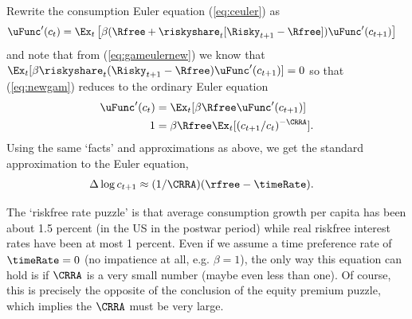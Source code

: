 \documentclass{handout}
\begin{document}

Rewrite the consumption Euler equation (\ref{eq:ceuler}) as 
\begin{equation}\begin{gathered}\begin{aligned}
        \uFunc^{\prime}(c_{t}) & =  \Ex_{t}\left[\beta (\Rfree  + \riskyshare_{t} [\Risky_{t+1} - \Rfree])\uFunc^{\prime}({c}_{t+1})\right] \label{eq:newgam}
\end{aligned}\end{gathered}\end{equation}
and note that from (\ref{eq:gameulernew}) we know that $\Ex_{t}[\beta 
\riskyshare_{t}(\Risky_{t+1}-\Rfree)\uFunc^{\prime}({c}_{t+1})] = 0$ so that 
(\ref{eq:newgam}) reduces to the ordinary Euler equation
\begin{equation}\begin{gathered}\begin{aligned}
        \uFunc^{\prime}(c_{t}) & =  \Ex_{t}[\beta \Rfree \uFunc^{\prime}({c}_{t+1})]
\\  1 & =  \beta \Rfree \Ex_{t}[ ({c}_{t+1}/c_{t})^{-\CRRA}].
\end{aligned}\end{gathered}\end{equation}
Using the same `facts' and approximations as above, we get the 
standard approximation to the Euler equation,
\begin{equation}\begin{gathered}\begin{aligned}
        \Delta \log c_{t+1} & \approx  (1/\CRRA) (\rfree - \timeRate).
\end{aligned}\end{gathered}\end{equation}

The `riskfree rate puzzle' is that average consumption growth per 
capita has been about 1.5 percent (in the US in the postwar period) 
while real riskfree interest rates have been at most 1 percent.  Even
if we assume a time preference rate of $\timeRate=0$ (no impatience 
at all, e.g. $\beta=1$), the only way this equation can hold is if $\CRRA$ is a
very small number (maybe even less than one).  Of course, this
is precisely the opposite of the conclusion of the equity premium
puzzle, which implies the $\CRRA$ must be very large.

 

\end{document}
